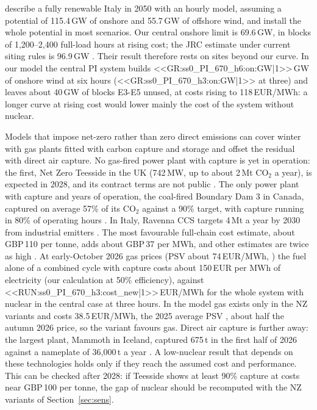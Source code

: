 \citet{Pastore2025} describe a fully renewable Italy in 2050 with an hourly model, assuming a potential of 115.4\,GW of onshore and 55.7\,GW of offshore wind, and install the whole potential in most scenarios. Our central onshore limit is 69.6\,GW, in blocks of 1{,}200--2{,}400 full-load hours at rising cost; the JRC estimate under current siting rules is 96.9\,GW \citep{JRCEUTIMES}. Their result therefore rests on sites beyond our curve. In our model the central PI system builds <<GR:ss0_PI_670_h6:on:GW|1>>\,GW of onshore wind at six hours (<<GR:ss0_PI_670_h3:on:GW|1>> at three) and leaves about 40\,GW of blocks E3-E5 unused, at costs rising to 118\,EUR/MWh: a longer curve at rising cost would lower mainly the cost of the system without nuclear.

Models that impose net-zero rather than zero direct emissions can cover winter with gas plants fitted with carbon capture and storage and offset the residual with direct air capture. No gas-fired power plant with capture is yet in operation: the first, Net Zero Teesside in the UK (742\,MW, up to about 2\,Mt CO$_2$ a year), is expected in 2028, and its contract terms are not public \citep{NZTPower}. The only power plant with capture and years of operation, the coal-fired Boundary Dam 3 in Canada, captured on average 57\% of its CO$_2$ against a 90\% target, with capture running in 80\% of operating hours \citep{IEEFABD3}. In Italy, Ravenna CCS targets 4\,Mt a year by 2030 from industrial emitters \citep{EniRavenna2026}. The most favourable full-chain cost estimate, about GBP\,110 per tonne, adds about GBP\,37 per MWh, and other estimates are twice as high \citep{Goodall2025}. At early-October 2026 gas prices (PSV about 74\,EUR/MWh, \citealp{SelectraPSV2026}) the fuel alone of a combined cycle with capture costs about 150\,EUR per MWh of electricity (our calculation at 50\% efficiency), against <<RUN:ss0_PI_670_h3:cost_new|1>>\,EUR/MWh for the whole system with nuclear in the central case at three hours. In the model gas exists only in the NZ variants and costs 38.5\,EUR/MWh, the 2025 average PSV \citep{GME2025}, about half the autumn 2026 price, so the variant favours gas. Direct air capture is further away: the largest plant, Mammoth in Iceland, captured 675\,t in the first half of 2026 against a nameplate of 36{,}000\,t a year \citep{Climeworks2026}. A low-nuclear result that depends on these technologies holds only if they reach the assumed cost and performance. This can be checked after 2028: if Teesside shows at least 90\% capture at costs near GBP\,100 per tonne, the gap of nuclear should be recomputed with the NZ variants of Section~\ref{sec:sens}.

